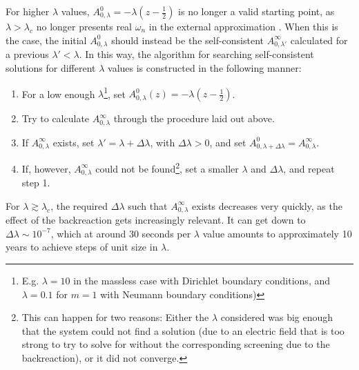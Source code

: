 For higher $\lambda$ values, $A_{0, \lambda}^0 = -\lambda \left(z - \frac{1}{2}\right)$ is no longer a valid starting point, as $\lambda > \lambda_c$ no longer presents real $\omega_n$ in the external approximation \cite{Ambj1983}. 
When this is the case, the initial $A_{0, \lambda}^0$ should instead be the self-consistent $A_{0, \lambda'}^\infty$ calculated for a previous $\lambda'< \lambda$.  In this way, the algorithm for searching self-consistent solutions for different $\lambda$ values is constructed in the following manner:
\begin{enumerate}
    \item For a low enough $\lambda$\footnote{E.g. $\lambda=10$ in the massless case with Dirichlet boundary conditions, and $\lambda=0.1$ for $m=1$ with Neumann boundary conditions)}, set $A_{0, \lambda}^0(z) = -\lambda (z - \frac{1}{2})$.
    \item Try to calculate $A_{0, \lambda}^\infty$ through the procedure laid out above.
    \item If $A_{0, \lambda}^\infty$ exists, set $\lambda' = \lambda + \Delta \lambda$, with $\Delta\lambda>0$, and set $A_{0, \lambda+\Delta\lambda}^0=A_{0, \lambda}^\infty$.
    \item If, however, $A_{0, \lambda}^\infty$ could not be found\footnote{This can happen for two reasons: Either the $\lambda$ considered was big enough that the system could not find a solution (due to an electric field that is too strong to try to solve for without the corresponding screening due to the backreaction), or it did not converge. 
    }, set a smaller $\lambda$ and $\Delta \lambda$, and repeat step 1. 
\end{enumerate}
For $\lambda \gtrsim \lambda_c$, the required $\Delta \lambda$ such that $A_{0, \lambda}^\infty$ exists decreases very quickly, as the effect of the backreaction gets increasingly relevant. It can get down to $\Delta \lambda \sim 10^{-7}$, which at around 30 seconds per $\lambda$ value amounts to approximately 10 years to achieve steps of unit size in $\lambda$.

